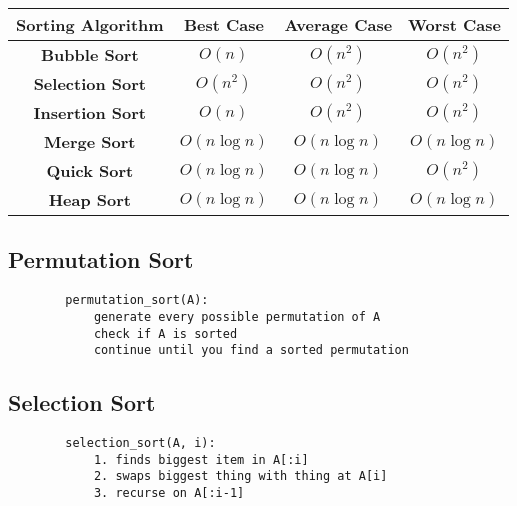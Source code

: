 \documentclass{article}
\begin{document}
\begin{tabular}{|c||c|c|c|}
    \hline
    \textbf{Sorting Algorithm} & \textbf{Best Case} & \textbf{Average Case} & \textbf{Worst Case} \\
    \hline
    \textbf{Bubble Sort} & $O(n)$ & $O(n^2)$ & $O(n^2)$ \\
    \textbf{Selection Sort} & $O(n^2)$ & $O(n^2)$ & $O(n^2)$ \\
    \textbf{Insertion Sort} & $O(n)$ & $O(n^2)$ & $O(n^2)$ \\
    \textbf{Merge Sort} & $O(n \log n)$ & $O(n \log n)$ & $O(n \log n)$ \\
    \textbf{Quick Sort} & $O(n \log n)$ & $O(n \log n)$ & $O(n^2)$ \\
    \textbf{Heap Sort} & $O(n \log n)$ & $O(n \log n)$ & $O(n \log n)$ \\
    \hline
    \end{tabular}

\subsection{Permutation Sort}
    \begin{verbatim}
        permutation_sort(A):
            generate every possible permutation of A
            check if A is sorted
            continue until you find a sorted permutation
    \end{verbatim}

\subsection{Selection Sort}
    \begin{verbatim}
        selection_sort(A, i):
            1. finds biggest item in A[:i]
            2. swaps biggest thing with thing at A[i]
            3. recurse on A[:i-1]
    \end{verbatim}
\end{document}
